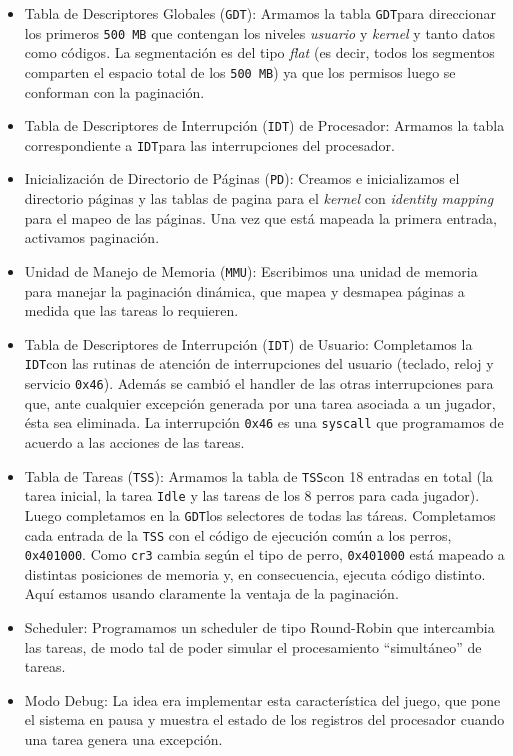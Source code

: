 \documentclass[twocolumn,10pt]{article}
\newcommand{\IDT}{\texttt{IDT}}
\newcommand{\MMU}{\texttt{MMU}}
\newcommand{\GDT}{\texttt{GDT}}
\newcommand{\TSS}{\texttt{TSS}}
\newcommand{\PD}{\texttt{PD}}
\begin{document}
\begin{itemize}
\item Tabla de Descriptores Globales (\GDT): Armamos la tabla
  \GDT para direccionar los primeros \texttt{500 MB} que
  contengan los niveles \emph{usuario} y \emph{kernel} y tanto datos
  como códigos. La segmentación es del tipo \emph{flat} (es decir,
  todos los segmentos comparten el espacio total de los \texttt{500
    MB}) ya que los permisos luego se conforman con la
  paginación.

\item Tabla de Descriptores de Interrupción (\IDT) de Procesador: Armamos la
  tabla correspondiente a \IDT para las interrupciones del
  procesador.

\item Inicialización de Directorio de Páginas (\PD): Creamos e
  inicializamos el directorio páginas y las tablas de pagina para el
  \emph{kernel} con \emph{identity mapping} para el mapeo de las
  páginas. Una vez que está mapeada la primera entrada, activamos
  paginación.

\item Unidad de Manejo de Memoria (\MMU): Escribimos una
  unidad de memoria para manejar la paginación dinámica, que mapea y
  desmapea páginas a medida que las tareas lo requieren.

\item Tabla de Descriptores de Interrupción (\IDT) de Usuario:
  Completamos la \IDT con las rutinas de atención de interrupciones
  del usuario (teclado, reloj y servicio \texttt{0x46}). Además se
  cambió el handler de las otras interrupciones para que, ante
  cualquier excepción generada por una tarea asociada a un jugador,
  ésta sea eliminada. La interrupción \texttt{0x46} es una
  \texttt{syscall} que programamos de acuerdo a las acciones de las tareas.

\item Tabla de Tareas (\TSS): Armamos la tabla de \TSS con 18 entradas
  en total (la tarea inicial, la tarea \texttt{Idle} y las tareas de
  los 8 perros para cada jugador). Luego completamos en la \GDT los
  selectores de todas las táreas. Completamos cada entrada de la \TSS
  con el código de ejecución común a los perros,
  \texttt{0x401000}. Como \texttt{cr3} cambia según el tipo de perro,
  \texttt{0x401000} está mapeado a distintas posiciones de memoria y, en
  consecuencia, ejecuta código distinto. Aquí estamos usando
  claramente la ventaja de la paginación.

\item Scheduler: Programamos un scheduler de tipo Round-Robin que
  intercambia las tareas, de modo tal de poder simular el
  procesamiento ``simultáneo'' de tareas.

\item Modo Debug: La idea era implementar esta característica del
  juego, que pone el sistema en pausa y muestra el estado de los
  registros del procesador cuando una tarea genera una excepción.

\end{itemize}
\end{document}
